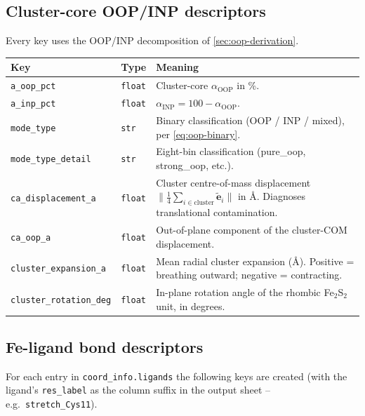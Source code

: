 \documentclass[10pt,a4paper,twoside]{article}
\newcommand{\evec}{\mathbf{e}}
\newcommand{\OOP}{\mathrm{OOP}}
\newcommand{\INP}{\mathrm{INP}}
\newcommand{\fn}[1]{\texttt{#1}}
\begin{document}
\subsection{Cluster-core OOP/INP descriptors}

Every key uses the OOP/INP decomposition of
\cref{sec:oop-derivation}.

\begin{longtable}{p{} p{} p{}}
\toprule
\textbf{Key} & \textbf{Type} & \textbf{Meaning} \\
\midrule
\texttt{a\_oop\_pct} & \texttt{float}
  & Cluster-core $\alpha_{\OOP}$ in \%. \\
\texttt{a\_inp\_pct} & \texttt{float}
  & $\alpha_{\INP} = 100 - \alpha_{\OOP}$. \\
\texttt{mode\_type} & \texttt{str}
  & Binary classification (OOP / INP / mixed), per
    \cref{eq:oop-binary}. \\
\texttt{mode\_type\_detail} & \texttt{str}
  & Eight-bin classification (pure\_oop, strong\_oop, etc.). \\
\texttt{ca\_displacement\_a} & \texttt{float}
  & Cluster centre-of-mass displacement
    $\lVert \tfrac{1}{4}\sum_{i \in \text{cluster}} \widetilde{\evec}_i\rVert$
    in \AA{}. Diagnoses translational contamination. \\
\texttt{ca\_oop\_a} & \texttt{float}
  & Out-of-plane component of the cluster-COM displacement. \\
\texttt{cluster\_expansion\_a} & \texttt{float}
  & Mean radial cluster expansion (\AA{}). Positive = breathing
    outward; negative = contracting. \\
\texttt{cluster\_rotation\_deg} & \texttt{float}
  & In-plane rotation angle of the rhombic Fe$_2$S$_2$ unit, in
    degrees. \\
\bottomrule
\end{longtable}

\subsection{Fe-ligand bond descriptors}

For each entry in \fn{coord\_info.ligands} the following keys are
created (with the ligand's \texttt{res\_label} as the column suffix
in the output sheet -- e.g.\ \texttt{stretch\_Cys11}).
\end{document}
